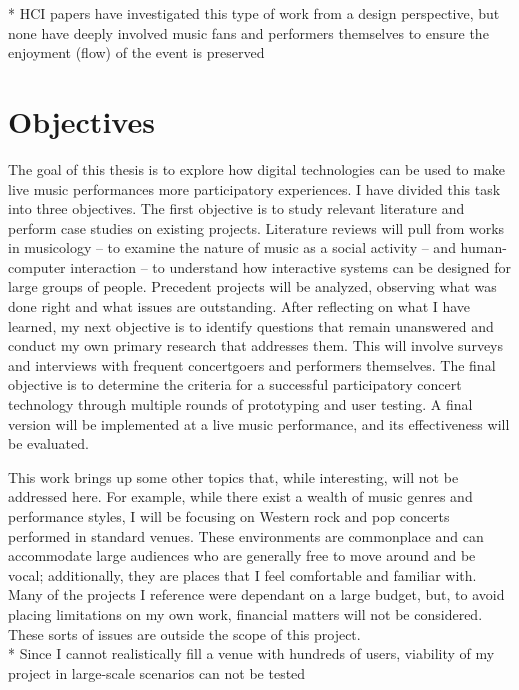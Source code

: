 * HCI papers have investigated this type of work from a design perspective, but none have deeply involved music fans and performers themselves to ensure the enjoyment (flow) of the event is preserved


\section{Objectives}

The goal of this thesis is to explore how digital technologies can be used to make live music performances more participatory experiences. I have divided this task into three objectives. The first objective is to study relevant literature and perform case studies on existing projects. Literature reviews will pull from works in musicology -- to examine the nature of music as a social activity -- and human-computer interaction -- to understand how interactive systems can be designed for large groups of people. Precedent projects will be analyzed, observing what was done right and what issues are outstanding. After reflecting on what I have learned, my next objective is to identify questions that remain unanswered and conduct my own primary research that addresses them. This will involve surveys and interviews with frequent concertgoers and performers themselves. The final objective is to determine the criteria for a successful participatory concert technology through multiple rounds of prototyping and user testing. A final version will be implemented at a live music performance, and its effectiveness will be evaluated.

This work brings up some other topics that, while interesting, will not be addressed here. For example, while there exist a wealth of music genres and performance styles, I will be focusing on Western rock and pop concerts performed in standard venues. These environments are commonplace and can accommodate large audiences who are generally free to move around and be vocal; additionally, they are places that I feel comfortable and familiar with. Many of the projects I reference were dependant on a large budget, but, to avoid placing limitations on my own work, financial matters will not be considered. These sorts of issues are outside the scope of this project.\\

* Since I cannot realistically fill a venue with hundreds of users, viability of my project in large-scale scenarios can not be tested


